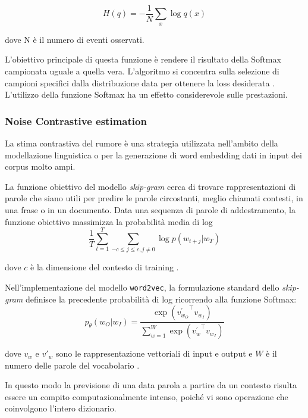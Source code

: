 \begin{equation}
H(q)=-\frac{1}{N}\sum_{x} \log q(x)
\end{equation}

dove N è il numero di eventi osservati.

L'obiettivo principale di questa funzione è rendere il risultato della Softmax campionata uguale a quella vera. L'algoritmo si concentra sulla selezione di campioni specifici dalla distribuzione data per ottenere la loss desiderata \cite{liu2016large}.  
L'utilizzo della funzione Softmax ha un effetto considerevole sulle prestazioni. 

\subsubsection{Noise Contrastive estimation}
\label{subsubsec:nce}

La stima contrastiva del rumore è una strategia utilizzata nell'ambito della modellazione linguistica o per la generazione di word embedding dati in input dei corpus molto ampi.

La funzione obiettivo del modello \emph{skip-gram} cerca di trovare rappresentazioni di parole che siano utili per predire le parole circostanti, meglio chiamati contesti, in una frase o in un documento. 
Data una sequenza di parole di addestramento, la funzione obiettivo massimizza la probabilità media di log
\begin{equation}
\frac{1}{T}\sum_{t=1}^{T} \sum_{-c \leq j \leq c, j \neq 0} \log p(w_{t+j} | w_T)
\end{equation}

dove $c$ è la dimensione del contesto di training \cite{mikolov2013distributed}. 

Nell'implementazione del modello \texttt{word2vec}, la formulazione standard dello \emph{skip-gram} definisce la precedente probabilità di log ricorrendo alla funzione Softmax:
\begin{equation}
p_{\theta}(w_{O} | w_{I}) = \frac{\exp({v^{\prime}_{w_{O}}}^{\top} v_{w_{I}})}{\sum_{w=1}^{W} \exp({v^{\prime}_{w}}^{\top} v_{w_I})}
\end{equation}

dove $v_w$ e $v'_w$ sono le rappresentazione vettoriali di input e output e $W$ è il numero delle parole del vocabolario \cite{dyer2014notes}.

In questo modo la previsione di una data parola a partire da un contesto risulta essere un compito computazionalmente intenso, poiché vi sono operazione che coinvolgono l'intero dizionario.

